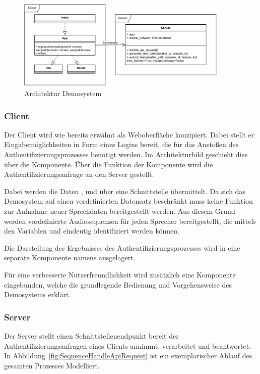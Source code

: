 \begin{figure}[H]
    \centering
    \includegraphics[width=0.9\textwidth, keepaspectratio]{images/Architektur-Demosystem}
    \caption{Architektur Demosystem}
    \label{fig:ArchitectureDemoSystem}
\end{figure}

\subsubsection{Client}
Der Client wird wie bereits erwähnt als Weboberfläche konzipiert.
Dabei stellt er Eingabemöglichkeiten in Form eines Logins bereit, die für das Anstoßen des Authentifizierungsprozesses benötigt werden.
Im Architekturbild geschieht dies über die  Komponente.
Über die  Funktion der Komponente wird die Authentifizierungsanfrage an den Server gestellt.

Dabei werden die Daten ,  und  über eine Schnittstelle übermittelt.
Da sich das Demosystem auf einen vordefinierten Datensatz beschränkt muss keine Funktion zur Aufnahme neuer Sprechdaten bereitgestellt werden.
Aus diesem Grund werden vordefinierte Audiosequenzen für jeden Sprecher bereitgestellt, die mittels den Variablen  und  eindeutig identifiziert werden können.

Die Darstellung des Ergebnisses des Authentifizierungsprozesses wird in eine separate Komponente namens  ausgelagert.

Für eine verbesserte Nutzerfreundlichkeit wird zusätzlich eine  Komponente eingebunden, welche die grundlegende Bedienung und Vorgehensweise des Demosystems erklärt.

\subsubsection{Server}
Der Server stellt einen Schnittstellenendpunkt bereit der Authentifizierungsanfragen eines Clients annimmt, verarbeitet und beantwortet.
In Abbildung~\ref{fig:SequenceHandleApiRequest} ist ein exemplarischer Ablauf des gesamten Prozesses Modelliert.

